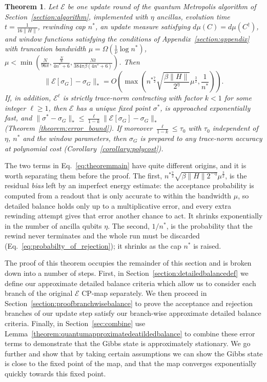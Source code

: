 \documentclass[aps,floatfix,10pt,amssymb,amsfont,amsmath,superscriptaddress,float,nofootinbib,longbibliography,nobalancelastpage,twocolumn]{revtex4-2}
\newtheorem{theorem}{Theorem}
\begin{document}
\begin{theorem}
\label{theorem:main}
Let $\mathcal{E}$ be one update round of the quantum Metropolis algorithm of Section~\ref{section:algorithm}, implemented with $\eta$ ancillas, evolution time $t = \frac{1}{16\|H\|}$, rewinding cap $n^*$, an update measure satisfying $d\mu(C)=d\mu(C^{\dagger})$, and window functions satisfying the conditions of Appendix~\ref{section:appendix} with truncation bandwidth $\mu = \Omega(\frac{1}{\nu}\log n^*)$, $\mu < \min(\frac{N}{96\pi}, \frac{\frac{N}{8}}{4n^*+6}, \frac{Nt}{384\pi\beta(4n^*+6)})$. Then
\begin{equation}
   \|\mathcal{E}[\sigma_G] - \sigma_G\|_* = O\left(\max\left( n^{*\frac{7}{2}}\sqrt{\frac{\beta\|H\| }{2^{\eta}}}\mu^{\frac{3}{2}},\frac{1}{n^*}\right)\right).
\label{eq:theoremmain}
\end{equation}
If, in addition, $\mathcal{E}^{\ell}$ is strictly trace-norm contracting with factor $k<1$ for some integer $\ell\geq1$, then $\mathcal{E}$ has a unique fixed point $\sigma^*$, is approached exponentially fast, and $\|\sigma^*-\sigma_G\|_* \leq \frac{\ell}{1-k}\|\mathcal{E}[\sigma_G] - \sigma_G\|_*$ (Theorem~\ref{theorem:error_bound}). If moreover $\frac{\ell}{1-k}\leq\tau_0$ with $\tau_0$ independent of $\eta$, $n^*$ and the window parameters, then $\sigma_G$ is prepared to any trace-norm accuracy at polynomial cost (Corollary~\ref{corollary:polycost}).
\end{theorem}

The two terms in Eq.~\eqref{eq:theoremmain} have quite different origins, and it is worth separating them before the proof. The first, $n^{*\frac{7}{2}}\sqrt{\beta\|H\|2^{-\eta}}\mu^{\frac{3}{2}}$, is the residual \emph{bias} left by an imperfect energy estimate: the acceptance probability is computed from a readout that is only accurate to within the bandwidth $\mu$, so detailed balance holds only up to a multiplicative error, and every extra rewinding attempt gives that error another chance to act. It shrinks exponentially in the number of ancilla qubits $\eta$. The second, $1/n^*$, is the probability that the rewind never terminates and the whole run must be discarded (Eq.~\eqref{eq:probabilty_of_rejection}); it shrinks as the cap $n^*$ is raised.

The proof of this theorem occupies the remainder of this section and is broken down into a number of steps. First, in Section~\ref{section:detailedbalancedef} we define our approximate detailed balance criteria which allow us to consider each branch of the original $\mathcal{E}$ CP-map separately. We then proceed in Section~\ref{section:proofbranchwisebalance} to prove the acceptance and rejection branches of our update step satisfy our branch-wise approximate detailed balance criteria. Finally, in Section~\ref{sec:combine} use Lemma~\ref{theorem:quantumapproximatedeatildedbalance} to combine these error terms to demonstrate that the Gibbs state is approximately stationary. We go further and show that by taking certain assumptions we can show the Gibbs state is close to the fixed point of the map, and that the map converges exponentially quickly towards this fixed point.
\end{document}
